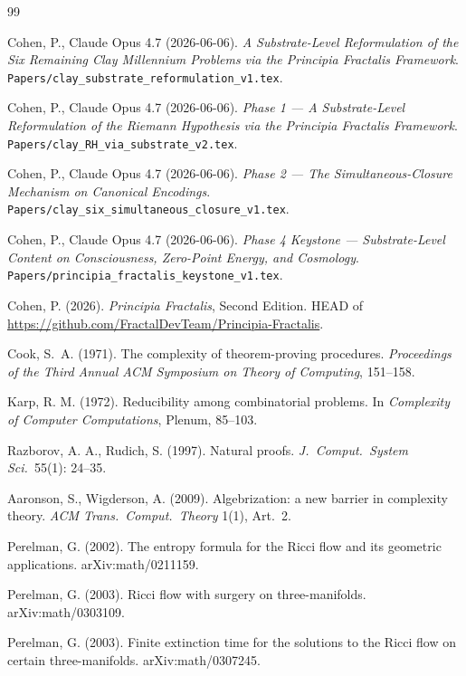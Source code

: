 \documentclass[11pt,a4paper]{article}
\theoremstyle{plain}
\theoremstyle{definition}
\begin{document}
\begin{thebibliography}{99}

Cohen, P., Claude Opus 4.7 (2026-06-06). \emph{A Substrate-Level
Reformulation of the Six Remaining Clay Millennium Problems via the
Principia Fractalis Framework}.
\texttt{Papers/clay\_substrate\_reformulation\_v1.tex}.

Cohen, P., Claude Opus 4.7 (2026-06-06). \emph{Phase 1 ---
A Substrate-Level Reformulation of the Riemann Hypothesis via the
Principia Fractalis Framework}.
\texttt{Papers/clay\_RH\_via\_substrate\_v2.tex}.

Cohen, P., Claude Opus 4.7 (2026-06-06). \emph{Phase 2 ---
The Simultaneous-Closure Mechanism on Canonical Encodings}.
\texttt{Papers/clay\_six\_simultaneous\_closure\_v1.tex}.

Cohen, P., Claude Opus 4.7 (2026-06-06). \emph{Phase 4 Keystone ---
Substrate-Level Content on Consciousness, Zero-Point Energy, and
Cosmology}.
\texttt{Papers/principia\_fractalis\_keystone\_v1.tex}.

Cohen, P. (2026). \emph{Principia Fractalis}, Second Edition.
HEAD of
\url{https://github.com/FractalDevTeam/Principia-Fractalis}.

Cook, S.\ A. (1971). The complexity of theorem-proving procedures.
\emph{Proceedings of the Third Annual ACM Symposium on Theory of
Computing}, 151--158.

Karp, R. M. (1972). Reducibility among combinatorial problems.
In \emph{Complexity of Computer Computations}, Plenum, 85--103.

Razborov, A. A., Rudich, S. (1997). Natural proofs.
\emph{J.\ Comput.\ System Sci.}\ 55(1): 24--35.

Aaronson, S., Wigderson, A. (2009). Algebrization: a new barrier in
complexity theory. \emph{ACM Trans.\ Comput.\ Theory} 1(1), Art.\ 2.

Perelman, G. (2002). The entropy formula for the Ricci flow and its
geometric applications. arXiv:math/0211159.

Perelman, G. (2003). Ricci flow with surgery on three-manifolds.
arXiv:math/0303109.

Perelman, G. (2003). Finite extinction time for the solutions to the
Ricci flow on certain three-manifolds. arXiv:math/0307245.

\end{thebibliography}
\end{document}
